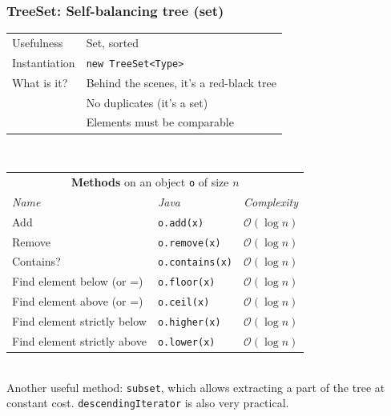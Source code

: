 \documentclass[8pt,aspectratio=169]{beamer}
\begin{document}
\begin{frame}
\frametitle{TreeSet: Self-balancing tree (set)}
\centering
\begin{tabular}{ll}
	Usefulness & Set, sorted\\
	Instantiation & \texttt{new TreeSet<Type>}\\
	What is it? & Behind the scenes, it's a red-black tree\\
	& \color{red} No duplicates (it's a set)\\
	& \color{red} Elements must be comparable
	
\end{tabular}\\
\centering
\begin{tabular}{lll}
	\multicolumn{3}{c}{\textbf{Methods} on an object \texttt{o} of size $n$} \\
	\textit{Name} & \textit{Java} & \textit{Complexity} \\
	Add & \texttt{o.add(x)} & $\mathcal{O}(\log n)$\\
	Remove & \texttt{o.remove(x)} & $\mathcal{O}(\log n)$\\
	Contains? & \texttt{o.contains(x)} & $\mathcal{O}(\log n)$\\
	Find element below (or =) & \texttt{o.floor(x)} & $\mathcal{O}(\log n)$\\
	Find element above (or =) & \texttt{o.ceil(x)} & $\mathcal{O}(\log n)$\\
	Find element strictly below & \texttt{o.higher(x)} & $\mathcal{O}(\log n)$\\
	Find element strictly above & \texttt{o.lower(x)} & $\mathcal{O}(\log n)$\\
\end{tabular}\\
\vspace{0.5cm}
\color{blue} Another useful method: \texttt{subset}, which allows extracting a part of the tree at constant cost. \texttt{descendingIterator} is also very practical.
\end{frame}
\end{document}
